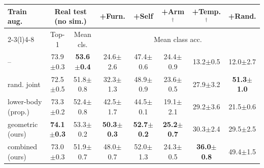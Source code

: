 \begin{tabular}{@{}lccccccc@{}}
\toprule
Train aug. & \multicolumn{2}{c}{Real test (no sim.)} & +Furn. & +Self & +Arm$^\dagger$ & +Temp.$^\dagger$ & +Rand. \\
\cmidrule(lr){2-3}\cmidrule(l){4-8}
 & Top-1 & Mean cls. & \multicolumn{5}{c}{Mean class acc.} \\
\midrule
-- & 73.9$\pm$0.3 & \textbf{53.6$\pm$0.4} & 24.6$\pm$2.6 & 47.4$\pm$0.6 & 24.4$\pm$0.9 & 13.2$\pm$0.5 & 12.0$\pm$2.7 \\
rand. joint & 72.5$\pm$0.5 & 51.8$\pm$0.8 & 32.3$\pm$1.3 & 48.9$\pm$0.9 & 23.6$\pm$0.5 & 27.9$\pm$3.2 & \textbf{51.3$\pm$1.0} \\
lower-body (prop.) & 73.3$\pm$0.2 & 52.4$\pm$0.8 & 42.5$\pm$1.7 & 44.5$\pm$0.1 & 19.1$\pm$2.1 & 29.2$\pm$3.6 & 21.5$\pm$0.6 \\
geometric (ours) & \textbf{74.1$\pm$0.3} & 53.3$\pm$0.2 & \textbf{50.3$\pm$0.3} & \textbf{52.7$\pm$0.2} & \textbf{25.2$\pm$0.7} & 30.3$\pm$2.4 & 29.5$\pm$2.5 \\
combined (ours) & 73.0$\pm$0.3 & 51.9$\pm$0.7 & 48.0$\pm$0.7 & 52.0$\pm$1.3 & 24.3$\pm$0.5 & \textbf{36.0$\pm$0.8} & 49.4$\pm$1.5 \\
\bottomrule
\end{tabular}
